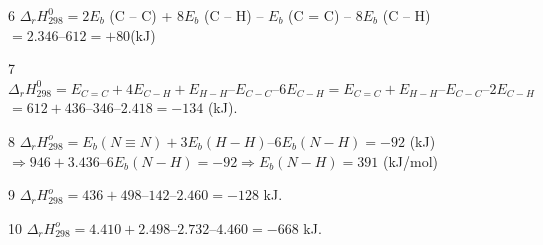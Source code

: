 \def\writeANS{\faKey\protect \, \TLsai{A}\TLsai{B}\TLsai{C}\TLdung{D}}
\def\writeANS{\faKey\protect \, \protect \circlenum {C}}
\begin{loigiaiex}{6}
  $\Delta _r H_{298}^0 = 2E_b$ (C – C) + $8E_b$ (C – H) – $E_b$ (C = C) – $8E_b$ (C – H)\\ $= 2.346 – 612 = +80$(kJ)
\end{loigiaiex}
\def\writeANS{\faKey\protect \, \TLsai{A}\TLsai{B}\TLsai{C}\TLdung{D}}
\def\writeANS{\faKey\protect \, \protect \circlenum {B}}
\begin{loigiaiex}{7}
  $\Delta _r H_{298}^0 = E_{C=C} + 4E_{C-H} + E_{H-H} – E_{C-C} – 6E_{C-H} = E_{C=C} + E_{H-H} – E_{C-C} – 2E_{C-H}$\\ $= 612 + 436 – 346 – 2.418 = -134$ (kJ).
\end{loigiaiex}
\def\writeANS{\faKey\protect \, \TLsai{A}\TLsai{B}\TLsai{C}\TLdung{D}}
\def\writeANS{\faKey\protect \, \protect \circlenum {A}}
\begin{loigiaiex}{8}
  $\Delta _r H_{298}^o = E_b(N \equiv N) + 3E_b(H-H) – 6E_b(N-H) = - 92$ (kJ)\\ $\Rightarrow 946 + 3.436 – 6 E_b(N-H) = - 92 \Rightarrow E_b(N-H) = 391$ (kJ/mol)
\end{loigiaiex}
\def\writeANS{\faKey\protect \, \TLsai{A}\TLsai{B}\TLsai{C}\TLdung{D}}
\def\writeANS{\faKey\protect \, \protect \circlenum {A}}
\begin{loigiaiex}{9}
  $\Delta _r H_{298}^o = 436 + 498 – 142 – 2.460 = -128$ kJ.
\end{loigiaiex}
\def\writeANS{\faKey\protect \, \TLsai{A}\TLsai{B}\TLsai{C}\TLdung{D}}
\def\writeANS{\faKey\protect \, \protect \circlenum {C}}
\begin{loigiaiex}{10}
  $\Delta _r H_{298}^o = 4.410 + 2.498 – 2.732 – 4.460 = -668$ kJ.
\end{loigiaiex}
